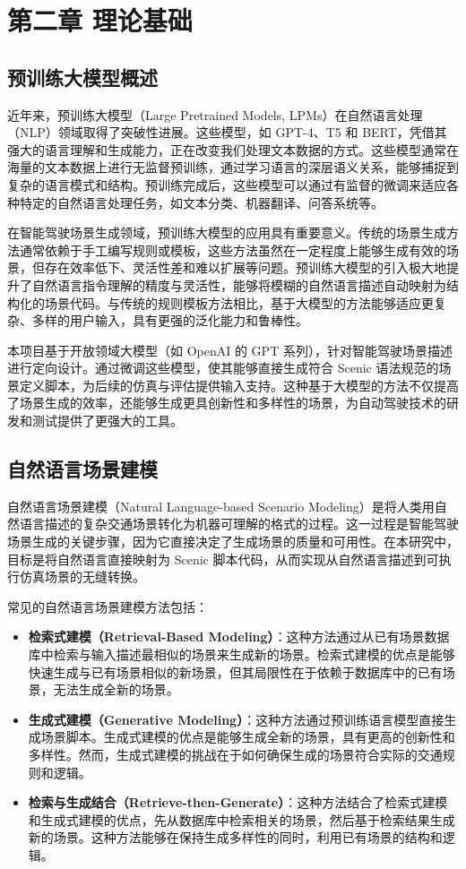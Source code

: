 \chapter{第二章 理论基础}
\section{预训练大模型概述}
近年来，预训练大模型（Large Pretrained Models, LPMs）在自然语言处理（NLP）领域取得了突破性进展。这些模型，如 GPT-4、T5 和 BERT，凭借其强大的语言理解和生成能力，正在改变我们处理文本数据的方式。这些模型通常在海量的文本数据上进行无监督预训练，通过学习语言的深层语义关系，能够捕捉到复杂的语言模式和结构。预训练完成后，这些模型可以通过有监督的微调来适应各种特定的自然语言处理任务，如文本分类、机器翻译、问答系统等。

在智能驾驶场景生成领域，预训练大模型的应用具有重要意义。传统的场景生成方法通常依赖于手工编写规则或模板，这些方法虽然在一定程度上能够生成有效的场景，但存在效率低下、灵活性差和难以扩展等问题。预训练大模型的引入极大地提升了自然语言指令理解的精度与灵活性，能够将模糊的自然语言描述自动映射为结构化的场景代码。与传统的规则模板方法相比，基于大模型的方法能够适应更复杂、多样的用户输入，具有更强的泛化能力和鲁棒性。

本项目基于开放领域大模型（如 OpenAI 的 GPT 系列），针对智能驾驶场景描述进行定向设计。通过微调这些模型，使其能够直接生成符合 Scenic 语法规范的场景定义脚本，为后续的仿真与评估提供输入支持。这种基于大模型的方法不仅提高了场景生成的效率，还能够生成更具创新性和多样性的场景，为自动驾驶技术的研发和测试提供了更强大的工具。

\section{自然语言场景建模}
自然语言场景建模（Natural Language-based Scenario Modeling）是将人类用自然语言描述的复杂交通场景转化为机器可理解的格式的过程。这一过程是智能驾驶场景生成的关键步骤，因为它直接决定了生成场景的质量和可用性。在本研究中，目标是将自然语言直接映射为 Scenic 脚本代码，从而实现从自然语言描述到可执行仿真场景的无缝转换。

常见的自然语言场景建模方法包括：
\begin{itemize}
	\item \textbf{检索式建模（Retrieval-Based Modeling）}：这种方法通过从已有场景数据库中检索与输入描述最相似的场景来生成新的场景。检索式建模的优点是能够快速生成与已有场景相似的新场景，但其局限性在于依赖于数据库中的已有场景，无法生成全新的场景。
	\item \textbf{生成式建模（Generative Modeling）}：这种方法通过预训练语言模型直接生成场景脚本。生成式建模的优点是能够生成全新的场景，具有更高的创新性和多样性。然而，生成式建模的挑战在于如何确保生成的场景符合实际的交通规则和逻辑。
	\item \textbf{检索与生成结合（Retrieve-then-Generate）}：这种方法结合了检索式建模和生成式建模的优点，先从数据库中检索相关的场景，然后基于检索结果生成新的场景。这种方法能够在保持生成多样性的同时，利用已有场景的结构和逻辑。
\end{itemize}

